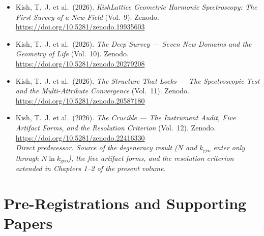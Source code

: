 \documentclass[11pt, letterpaper, openany]{book}
\newcommand{\kgeo}{k_{\mathrm{geo}}}
\begin{document}
\begin{itemize}
{          Map and the Sovereign Lake Architecture} (Vol.~8).
          Zenodo. \url{https://doi.org/10.5281/zenodo.19622632}
    \item Kish, T.~J. et al.\ (2026). \textit{KishLattice Geometric Harmonic Spectroscopy:
          The First Survey of a New Field} (Vol.~9).
          Zenodo. \url{https://doi.org/10.5281/zenodo.19935603}
    \item Kish, T.~J. et al.\ (2026). \textit{The Deep Survey --- Seven New Domains and the
          Geometry of Life} (Vol.~10).
          Zenodo. \url{https://doi.org/10.5281/zenodo.20279208}
    \item Kish, T.~J. et al.\ (2026). \textit{The Structure That Locks --- The Spectroscopic
          Test and the Multi-Attribute Convergence} (Vol.~11).
          Zenodo. \url{https://doi.org/10.5281/zenodo.20587180}
    \item Kish, T.~J. et al.\ (2026). \textit{The Crucible --- The Instrument Audit, Five
          Artifact Forms, and the Resolution Criterion} (Vol.~12).
          Zenodo. \url{https://doi.org/10.5281/zenodo.22416330}
          \\ \textit{Direct predecessor. Source of the degeneracy result
          ($N$ and $\kgeo$ enter only through $N\ln\kgeo$), the five artifact forms, and the
          resolution criterion extended in Chapters 1--2 of the present volume.}
\end{itemize}

\section*{Pre-Registrations and Supporting Papers}
\end{document}

